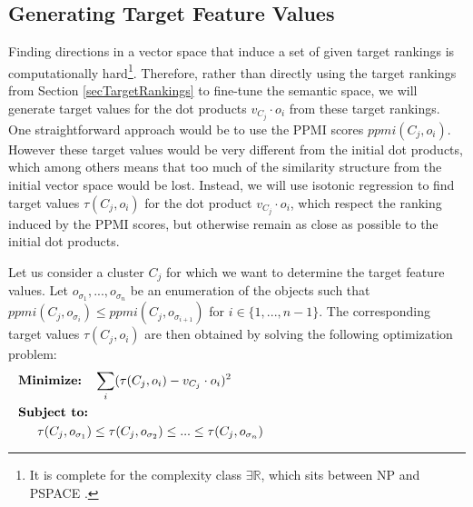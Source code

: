 
\subsection{Generating Target Feature Values}
Finding directions in a vector space that induce a set of given target rankings is computationally hard\footnote{It is complete for the complexity class $\exists\mathbb{R}$, which sits between NP and PSPACE \cite{DBLP:conf/ijcai/SchockaertL15}.}. Therefore, rather than directly using the target rankings from Section \ref{secTargetRankings} to fine-tune the semantic space, we will generate target values for the dot products $v_{C_j} \cdot o_i$ from these target rankings. One straightforward approach would be to use the PPMI scores $\textit{ppmi}(C_j,o_i)$. However these target values would be very different from the initial dot products, which among others means that too much of the similarity structure from the initial vector space would be lost. Instead, we will use isotonic regression to find target values $\tau(C_j,o_i)$ for the dot product $v_{C_j} \cdot o_i$, which respect the ranking induced by the PPMI scores, but otherwise remain as close as possible to the initial dot products. 

Let us consider a cluster $C_j$ for which we want to determine the target feature values. Let $o_{\sigma_1},...,o_{\sigma_n}$ be an enumeration of the objects such that $\textit{ppmi}(C_j,o_{\sigma_i}) \leq \textit{ppmi}(C_j,o_{\sigma_{i+1}})$ for $i\in \{1,...,n-1\}$. The corresponding target values $\tau(C_j,o_i)$ are then obtained by solving the following optimization problem:
\begin{align*}
&\textbf{Minimize:}\quad\sum_{i} (\tau(C_j,o_i) - v_{C_j} \cdot o_i)^{2}\quad\quad\quad\quad\\
&\textbf{Subject to:} \\
\noalign{$\tau(C_j,o_{\sigma_1}) \leq \tau(C_j,o_{\sigma_2}) \leq ... \leq \tau(C_j,o_{\sigma_n})$}
\end{align*}

